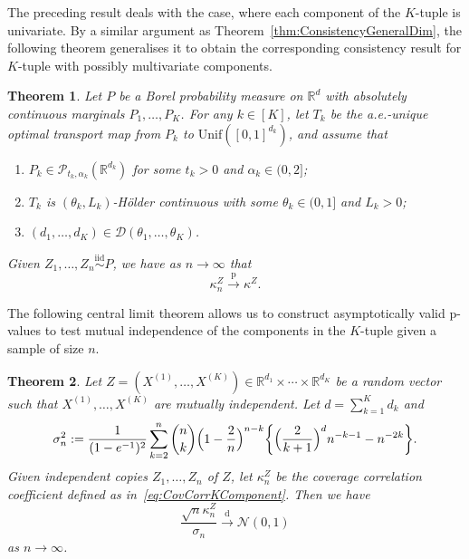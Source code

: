 \documentclass[11pt]{article}
\newtheorem{thm}{Theorem}
\newcommand{\pto}{\xrightarrow{\,\mathrm{p}\,} }
\newcommand{\dto}{\xrightarrow{\,\mathrm{d}\,} }
\begin{document}
The preceding result deals with the case, where each component of the $K$-tuple is univariate. By a similar argument as Theorem~\ref{thm:ConsistencyGeneralDim}, the following theorem generalises it to obtain the corresponding consistency result for $K$-tuple with possibly multivariate components. 
\begin{thm}\label{thm:ConsistencyKComponent}
    Let $P$ be a Borel probability measure on $\mathbb{R}^{d}$ with absolutely continuous marginals $P_1,\ldots, P_K$. For any $k \in [K]$, let $T_k$ be the a.e.-unique optimal transport map from $P_k$ to $\mathrm{Unif}([0,1]^{d_k})$, and assume that
    \begin{enumerate}[label = (C\arabic*'), ref=(C\arabic*')]
    \item $P_k\in \mathcal{P}_{t_k, \alpha_k}(\mathbb{R}^{d_k})$ for some $t_k>0$ and $\alpha_k\in (0, 2]$; 
    \item $T_k$ is $(\theta_k, L_k)$-H\"older continuous with some $\theta_k\in(0,1]$ and $L_k>0$; 
    \item\label{ass:Kdimensionregime}  $(d_1, \ldots, d_K) \in \mathcal{D}(\theta_1, \ldots, \theta_K)$. 
\end{enumerate}

Given $Z_1,\ldots,Z_n \stackrel{\mathrm{iid}}{\sim}P$, we have as $n\to\infty$ that
\begin{equation*}
\kappa_n^{Z} \pto \kappa^{Z}.
\end{equation*}
\end{thm}

The following central limit theorem allows us to construct asymptotically valid p-values to test mutual independence of the components in the $K$-tuple given a sample of size $n$.
\begin{thm}
\label{Thm:KVariateCoverageCLT}
Let $Z=(X^{(1)},\ldots,X^{(K)})\in
    \mathbb{R}^{d_1}\times\cdots\times\mathbb{R}^{d_K}$ be a random vector such that $X^{(1)},\ldots,X^{(K)}$ are mutually independent. Let $d = \sum_{k = 1}^K d_k$ and
\[
    \sigma_{n}^2 := \frac{1}{(1-e^{-1})^2}\sum_{k=2}^n \binom{n}{k}
    \Bigl(1 - \frac{2}{n}\Bigr)^{n-k}
    \biggl\{\Bigl(\frac{2}{k + 1}\Bigr)^{d} n^{-k -1} - n^{-2k}\biggr\}.
\]
Given independent copies $Z_1,\ldots, Z_n$ of $Z$, let $\kappa_n^Z$ be the coverage correlation coefficient defined as in~\eqref{eq:CovCorrKComponent}. Then we have
\[
    \frac{\sqrt{n} \kappa_n^{Z}}{\sigma_{n}} \dto \mathcal{N}(0, 1)
\]
as $n\to\infty$.
\end{thm}
\end{document}
